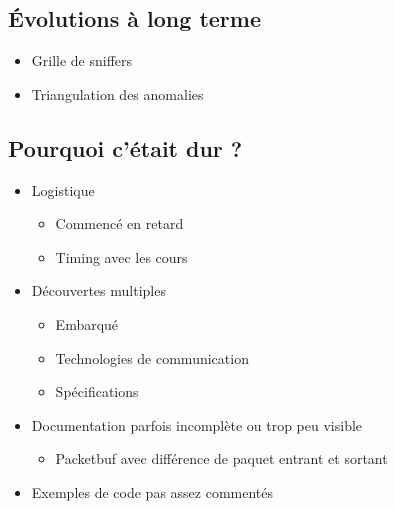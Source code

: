 	\subsection{Évolutions à long terme}
		\begin{itemize}
			\item Grille de sniffers
			\item Triangulation des anomalies
		\end{itemize}
	\subsection{Pourquoi c'était dur ?}
		\begin{itemize}
			\item Logistique
			\begin{itemize}
				\item Commencé en retard
				\item Timing avec les cours
			\end{itemize}
			\item Découvertes multiples
			\begin{itemize}
				\item Embarqué
				\item Technologies de communication
				\item Spécifications
			\end{itemize}
			\item Documentation parfois incomplète ou trop peu visible
			\begin{itemize}
				\item Packetbuf avec différence de paquet entrant et sortant
			\end{itemize}
			\item Exemples de code pas assez commentés
		\end{itemize}

